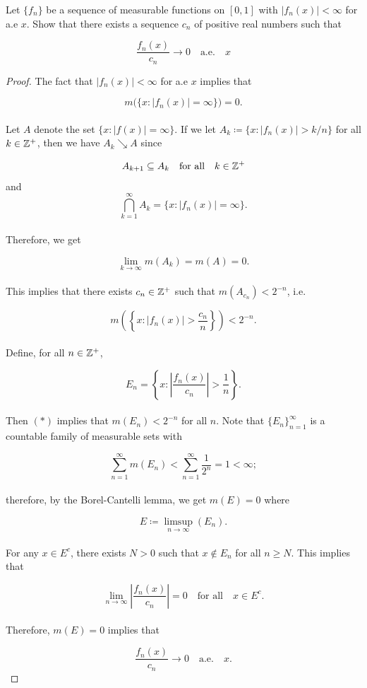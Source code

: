 \documentclass[12pt, a4paper, openany, twoside]{book}
\theoremstyle{definition}
\theoremstyle{remark}
\theoremstyle{plain}
\numberwithin{equation}{section}
\begin{document}
\newpage

\begin{tcolorbox}[colback=yellow!10!white,colframe=gray!75!black,title=Exercise 1.17]\label{Exercise 1.17}
    Let $\{f_n\}$ be a sequence of measurable functions on $[0,1]$ with $|f_n(x)|<\infty$ for a.e $x$. Show that there exists a sequence $c_n$ of positive real numbers such that

    \[\frac{f_n(x)}{c_n}\rightarrow 0\quad\text{a.e.}\quad x\]

    \vspace{5mm}
\end{tcolorbox}
\begin{proof}
    The fact that $|f_n(x)|<\infty$ for a.e $x$ implies that 

    \[m\big(\{x:|f_n(x)|=\infty\}\big)=0.\]
    \\
    Let $A$ denote the set $\{x:|f(x)|=\infty\}$. If we let $A_k\coloneqq\{x:|f_n(x)|>k/n\}$ for all $k\in{\mathbb {Z}}^+$, then we have $A_k\searrow A$ since 

    \[A_{k+1}\subseteq A_k\quad\text{for all}\quad k\in{\mathbb {Z}}^+\]
    and
    \[\bigcap_{k=1}^{\infty}{A_k}=\{x:|f_n(x)|=\infty\}.\]
    \\
    Therefore, we get 

    \[\lim_{k\rightarrow\infty}{m(A_k)}=m(A)=0.\]
    \\
    This implies that there exists $c_n\in{\mathbb {Z}}^+$ such that $m(A_{c_n})<2^{-n}$, i.e.

    \[m\left(\left\{x:|f_n(x)|>\frac{c_n}{n}\right\}\right)<2^{-n}.\tag{\(*\)}\]
    \\
    Define, for all $n\in{\mathbb {Z}}^+$, 

    \[E_n=\left\{x:\left|\frac{f_n(x)}{c_n}\right|>\frac{1}{n}\right\}.\]
    \\
    Then $(*)$ implies that $m(E_n)<2^{-n}$ for all $n$. Note that $\{E_n\}_{n=1}^{\infty}$ is a countable family of measurable sets with

    \[\sum_{n=1}^{\infty}{m(E_n)}<\sum_{n=1}^{\infty}{\frac{1}{2^n}}=1<\infty;\]
    \\
    therefore, by the Borel-Cantelli lemma, we get $m(E)=0$ where

    \[E\coloneqq\limsup_{n\rightarrow\infty}{(E_n)}.\]
    \\
    For any $x\in E^c$, there exists $N>0$ such that $x\notin E_n$ for all $n\geq N$. This implies that

    \[\lim_{n\rightarrow\infty}{\left|\frac{f_n(x)}{c_n}\right|}=0\quad\text{for all}\quad x\in E^c.\]
    \\
    Therefore, $m(E)=0$ implies that     

    \[\frac{f_n(x)}{c_n}\rightarrow0\quad\text{a.e.}\quad x.\]
\end{proof}
\end{document}

